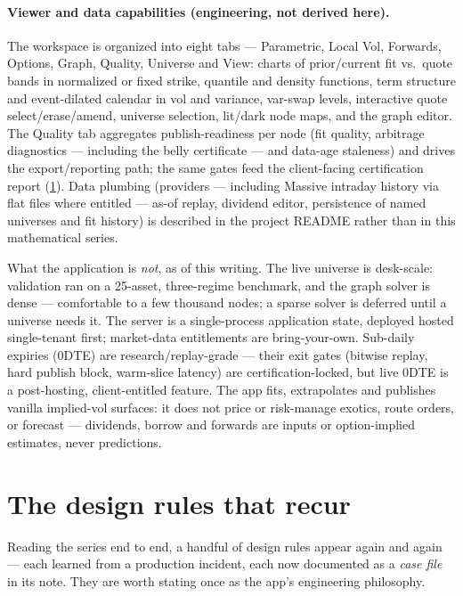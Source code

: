 \documentclass[11pt]{article}
\begin{document}
\paragraph{Viewer and data capabilities (engineering, not derived here).} The
workspace is organized into eight tabs --- Parametric, Local Vol, Forwards,
Options, Graph, Quality, Universe and View: charts of prior/current fit vs.\
quote bands in normalized or fixed strike, quantile and density functions, term
structure and event-dilated calendar in vol and variance, var-swap levels,
interactive quote select/erase/amend, universe selection, lit/dark node maps,
and the graph editor. The Quality tab aggregates publish-readiness per node
(fit quality, arbitrage diagnostics --- including the belly certificate ---
and data-age staleness) and drives the export/reporting path; the same gates
feed the client-facing certification report (\cref{sec:rules}). Data plumbing (providers --- including Massive intraday
history via flat files where entitled --- as-of replay, dividend editor,
persistence of named universes and fit history) is described in the project
README rather than in this mathematical series.

\begin{remark}
What the application is \emph{not}, as of this writing. The live universe is
desk-scale: validation ran on a 25-asset, three-regime benchmark, and the graph
solver is dense --- comfortable to a few thousand nodes; a sparse solver is
deferred until a universe needs it. The server is a single-process application
state, deployed hosted single-tenant first; market-data entitlements are
bring-your-own. Sub-daily expiries (0DTE) are research/replay-grade --- their exit gates
(bitwise replay, hard publish block, warm-slice latency) are
certification-locked, but live 0DTE is a post-hosting, client-entitled
feature.
The app fits, extrapolates and publishes vanilla implied-vol surfaces: it does
not price or risk-manage exotics, route orders, or forecast --- dividends,
borrow and forwards are inputs or option-implied estimates, never predictions.
\end{remark}

\section{The design rules that recur}
\label{sec:rules}

Reading the series end to end, a handful of design rules appear again and
again --- each learned from a production incident, each now documented as a
\emph{case file} in its note. They are worth stating once as the app's
engineering philosophy.
\end{document}
